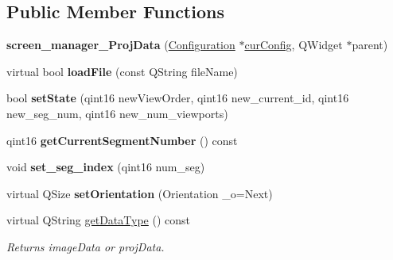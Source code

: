 \subsection*{Public Member Functions}
\begin{DoxyCompactItemize}
\item 
\mbox{\label{classscreen__manager__ProjData_ac60289abf8958ad664a826f5acb75b79}} 
{\bfseries screen\+\_\+manager\+\_\+\+Proj\+Data} (\mbox{\hyperlink{classConfiguration}{Configuration}} $\ast$\mbox{\hyperlink{classScreen__manager_add6a20bb797b0a544aed8b84371a4f24}{cur\+Config}}, Q\+Widget $\ast$parent)
\item 
\mbox{\label{classscreen__manager__ProjData_ae31f5cec9fa678f9ab450c86f0d92f14}} 
virtual bool {\bfseries load\+File} (const Q\+String file\+Name)
\item 
\mbox{\label{classscreen__manager__ProjData_a994944bf714e64c14fec83e7a90bde8f}} 
bool {\bfseries set\+State} (qint16 new\+View\+Order, qint16 new\+\_\+current\+\_\+id, qint16 new\+\_\+seg\+\_\+num, qint16 new\+\_\+num\+\_\+viewports)
\item 
\mbox{\label{classscreen__manager__ProjData_a9959ff321ca719db4885cd455f5e1c85}} 
qint16 {\bfseries get\+Current\+Segment\+Number} () const
\item 
\mbox{\label{classscreen__manager__ProjData_a9aeab9515cdae43d551dbead36a976b9}} 
void {\bfseries set\+\_\+seg\+\_\+index} (qint16 num\+\_\+seg)
\item 
\mbox{\label{classscreen__manager__ProjData_a8f06a3f2795233478e3d2fac82f41bff}} 
virtual Q\+Size {\bfseries set\+Orientation} (Orientation \+\_\+o=Next)
\item 
\mbox{\label{classscreen__manager__ProjData_a0f256fa37e1bb4f1e85cd1be9cfefe1a}} 
virtual Q\+String \mbox{\hyperlink{classscreen__manager__ProjData_a0f256fa37e1bb4f1e85cd1be9cfefe1a}{get\+Data\+Type}} () const
\begin{DoxyCompactList}\small\item\em Returns image\+Data or proj\+Data. \end{DoxyCompactList}\item 

\end{DoxyCompactItemize}

